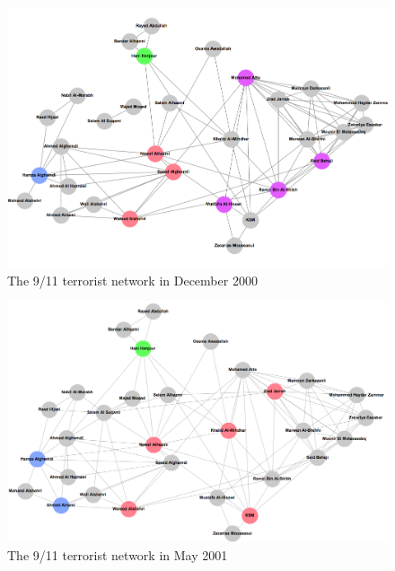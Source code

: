 \begin{subappendices}
\begin{figure}[h]
\begin{center}
\includegraphics[scale=0.4]{imgs/T2000-12.png}
\end{center}
\caption{The 9/11 terrorist network in December 2000}
\label{Terrorist-Dec00}
\end{figure}

\begin{figure}[h]
\begin{center}
\includegraphics[scale=0.4]{imgs/T2001-05.png}
\end{center}
\caption{The 9/11 terrorist network in May 2001}
\label{Terrorist-May01}
\end{figure}


\end{subappendices}
